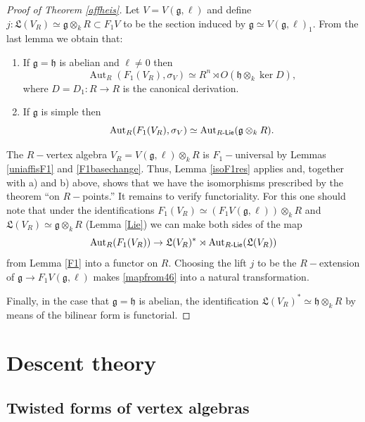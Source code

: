 \documentclass{article}
\theoremstyle{definition}
\def\Aut{\ensuremath{\operatorname{Aut}}}
\def\RLie{\ensuremath{R\text{-\textup{\textsf{Lie}}}}}
\begin{document}
\begin{proof}[Proof of Theorem \ref{affheis}] Let $V =  V(\mathfrak g, \ell)$ and define $j \colon \mathfrak L(V_R) \simeq \mathfrak g \otimes_k R \subset F_1V$ to be the section induced by $\mathfrak g \simeq V(\mathfrak g, \ell)_1$. From the last lemma we obtain that:
\begin{enumerate}[label = \textup{\alph*)}]
        \item \label{F1unia} If $\mathfrak g = \mathfrak h$ is abelian and $\ell \neq 0$ then \[ \Aut_R(F_1(V_R), \sigma_V) \simeq R^n \rtimes O(\mathfrak h \otimes_k \ker D),\]
        where $D = D_1 \colon R \to R$ is the canonical derivation.
        \item \label{F1unib} If $\mathfrak g$ is simple then \[ \Aut_R(F_1(V_R), \sigma_V) \simeq \Aut_{\RLie}(\mathfrak g \otimes_k R).\]
    \end{enumerate}

    The $R-$vertex algebra $V_R = V(\mathfrak g, \ell) \otimes_k R$ is $F_1-$universal by Lemmas \ref{uniaffisF1} and \ref{F1basechange}.
    Thus, Lemma \ref{isoF1res} applies and, together with a) and b) above, shows that we have the isomorphisms prescribed by the theorem ``on $R-$points.'' It remains to verify functoriality.
    For this one should note that under the identifications $F_1(V_R) \simeq (F_1 V(\mathfrak g, \ell)) \otimes_k R$ and $\mathfrak L(V_R) \simeq \mathfrak g \otimes_k R$ (Lemma \ref{Lie}) we can make both sides of the map 
    \begin{equation}\label{mapfrom46} \Aut_R(F_1 (V_R)) \to \mathfrak L(V_R)^\ast \rtimes \Aut_{\RLie}(\mathfrak L(V_R))\end{equation}
    from Lemma \ref{F1} into a functor on $R.$  Choosing the lift $j$ to be the $R-$extension of $\mathfrak g \to F_1V(\mathfrak g,\ell)$ makes \eqref{mapfrom46} into a natural transformation.
    
    Finally, in the case that $\mathfrak g = \mathfrak h$ is abelian,  the identification $\mathfrak L(V_R)^\ast \simeq \mathfrak h \otimes_k R$ by means of the bilinear form is functorial.
\end{proof}

\section{Descent theory} 
\subsection{Twisted forms of vertex algebras} \label{tfva}
\end{document}
